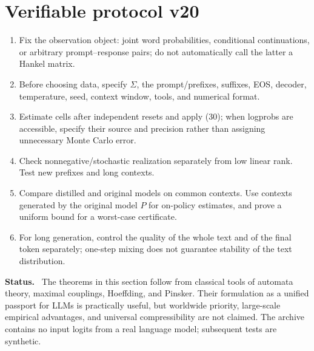 \documentclass[11pt,a4paper,oneside]{book}
\newcommand{\note}[1]{\par\medskip\noindent\textbf{#1}\ }
\begin{document}
\section*{Verifiable protocol v20}
\begin{enumerate}
\item Fix the observation object: joint word probabilities, conditional continuations, or arbitrary prompt--response pairs; do not automatically call the latter a Hankel matrix.
\item Before choosing data, specify $\Sigma$, the prompt/prefixes, suffixes, EOS, decoder, temperature, seed, context window, tools, and numerical format.
\item Estimate cells after independent resets and apply (30); when logprobs are accessible, specify their source and precision rather than assigning unnecessary Monte Carlo error.
\item Check nonnegative/stochastic realization separately from low linear rank. Test new prefixes and long contexts.
\item Compare distilled and original models on common contexts. Use contexts generated by the original model $P$ for on-policy estimates, and prove a uniform bound for a worst-case certificate.
\item For long generation, control the quality of the whole text and of the final token separately; one-step mixing does not guarantee stability of the text distribution.
\end{enumerate}
\note{Status.} The theorems in this section follow from classical tools of automata theory, maximal couplings, Hoeffding, and Pinsker. Their formulation as a unified passport for LLMs is practically useful, but worldwide priority, large-scale empirical advantages, and universal compressibility are not claimed. The archive contains no input logits from a real language model; subsequent tests are synthetic.
\end{document}

